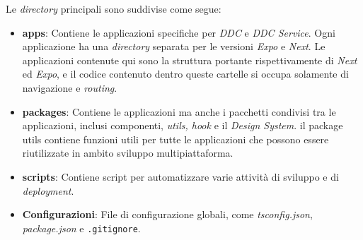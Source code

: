 Le \textit{directory} principali sono suddivise come segue:
\begin{itemize}
    \item \textbf{apps}: Contiene le applicazioni specifiche per \textit{DDC} e \textit{DDC Service}. 
    Ogni applicazione ha una \textit{directory} separata per le versioni \textit{Expo} e \textit{Next}.
    Le applicazioni contenute qui sono la struttura portante rispettivamente di \textit{Next} ed \textit{Expo}, e il codice contenuto dentro queste cartelle si occupa solamente di navigazione e \textit{routing}.
    \item \textbf{packages}: Contiene le applicazioni ma anche i pacchetti condivisi tra le applicazioni, inclusi componenti, \textit{utils, hook} e il \textit{Design System}.
    il package utils contiene funzioni utili per tutte le applicazioni che possono essere riutilizzate in ambito sviluppo multipiattaforma.
    \item \textbf{scripts}: Contiene script per automatizzare varie attività di sviluppo e di \textit{deployment}.
    \item \textbf{Configurazioni}: File di configurazione globali, come \textit{tsconfig.json}, \textit{package.json} e \texttt{.gitignore}.
\end{itemize}

